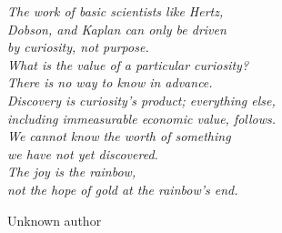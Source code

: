 \clearpage

\thispagestyle{empty}
\null\vfill

\centering
\parbox{9cm}{%
  \raggedright{\normalsize \textit{%
  The work of basic scientists like Hertz, \\
  Dobson, and Kaplan can only be driven \\
  by curiosity, not purpose. \\
  What is the value of a particular curiosity? \\
  There is no way to know in advance. \\
  Discovery is curiosity’s product; everything else, \\
  including immeasurable economic value, follows. \\
  We cannot know the worth of something \\
  we have not yet discovered. \\
  The joy is the rainbow, \\
  not the hope of gold at the rainbow’s end.}\par\bigskip
  }   
  \raggedleft\small Unknown author\par%
}
\vfill\vfill

\clearpage